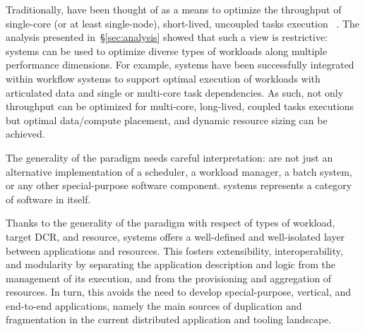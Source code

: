 \documentclass{sig-alternate}
\begin{document}
Traditionally, \pilots have been thought of as a means to optimize the
throughput of single-core (or at least single-node), short-lived, uncoupled
tasks execution ~\cite{pordes2007,sfiligoi2009,juve2010}. The analysis presented
in~\S\ref{sec:analysis} showed that such a view is restrictive: \pilot systems
can be used to optimize diverse types of workloads along multiple performance
dimensions. For example, \pilot systems have been successfully integrated within
workflow systems to support optimal execution of workloads with articulated data
and single or multi-core task dependencies. As such, not only throughput can be
optimized for multi-core, long-lived, coupled tasks executions but optimal
data/compute placement, and dynamic resource sizing can be achieved.




The generality of the \pilot paradigm needs careful interpretation:
\pilots are not just an alternative implementation of a scheduler, a workload
manager, a batch system, or any other special-purpose software component. \pilot
systems represents a category of software in itself.

Thanks to the generality of the \pilot paradigm with respect of types of workload,
target DCR, and resource, \pilot systems offers a well-defined and well-isolated
layer between applications and resources. This fosters extensibility,
interoperability, and modularity by separating the application description and
logic from the management of its execution, and from the provisioning and
aggregation of resources. In turn, this avoids the need to develop
special-purpose, vertical, and end-to-end applications, namely the main sources
of duplication and fragmentation in the current distributed application and
tooling landscape. 

\end{document}

